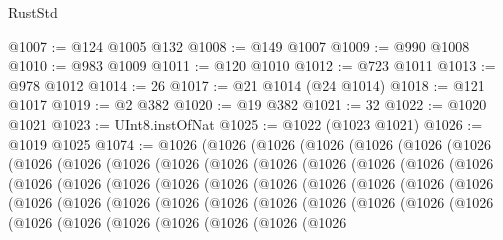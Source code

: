 \begin{lexlean}{RustStd}
\begin{coremodule}
@1007 := @124 @1005 @132
@1008 := @149 @1007
@1009 := @990 @1008
@1010 := @983 @1009
@1011 := @120 @1010
@1012 := @723 @1011
@1013 := @978 @1012
@1014 := 26
@1017 := @21 @1014 (@24 @1014)
@1018 := @121 @1017
@1019 := @2 @382
@1020 := @19 @382
@1021 := 32
@1022 := @1020 @1021
@1023 := UInt8.instOfNat
@1025 := @1022 (@1023 @1021)
@1026 := @1019 @1025
@1074 := @1026
    (@1026
      (@1026
        (@1026
          (@1026
            (@1026
              (@1026
                (@1026
                  (@1026
                    (@1026
                      (@1026
                        (@1026
                          (@1026
                            (@1026
                              (@1026
                                (@1026
                                  (@1026
                                    (@1026
                                      (@1026
                                        (@1026
                                          (@1026
                                            (@1026
                                              (@1026
                                                (@1026
                                                  (@1026
                                                    (@1026
                                                      (@1026
                                                        (@1026
                                                          (@1026
                                                            (@1026
                                                              (@1026
                                                                (@1026
                                                                  (@1026
                                                                    (@1026
                                                                      (@1026
                                                                        (@1026
                                                                          (@1026
                                                                            (@1026
                                                                              (@1026
                                                                                (@1026
                                                                                  (@1026
                                                                                    (@1026
                                                                                      (@1026
                                                                                        (@1026

\end{coremodule}
\end{lexlean}
